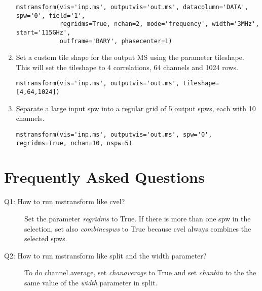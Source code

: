 \begin{enumerate}
\begin{verbatim}
mstransform(vis='inp.ms', outputvis='out.ms', datacolumn='DATA', spw='0', field='1', 
            regridms=True, nchan=2, mode='frequency', width='3MHz', start='115GHz', 
            outframe='BARY', phasecenter=1)
\end{verbatim}
\item Set a custom tile shape for the output MS using the parameter tileshape. This will
set the tileshape to 4 correlations, 64 channels and 1024 rows.
\begin{verbatim}
mstransform(vis='inp.ms', outputvis='out.ms', tileshape=[4,64,1024])
\end{verbatim}
\item Separate a large input spw into a regular grid of 5 output spws, each with 10 channels.
\begin{verbatim}
mstransform(vis='inp.ms', outputvis='out.ms', spw='0', regridms=True, nchan=10, nspw=5)
\end{verbatim}



\end{enumerate}

\section{Frequently Asked Questions}\label{Sec:FAQ}
\begin{description}
  \item[Q1: How to run mstransform like cvel?] \hfill 
  Set the parameter {\it regridms} to True. If there is more than one spw in the
selection, set also {\it combinespws} to True because cvel always combines the selected
spws.

  \item[Q2: How to run mstransform like split and the width parameter?] \hfill 
  To do channel average, set {\it chanaverage} to True and set {\it chanbin} to the
  the same value of the {\it width} parameter in split.

\end{description}


